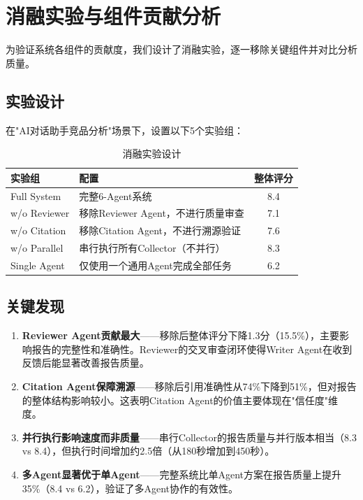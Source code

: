 \documentclass[12pt,a4paper]{ctexrep}
\begin{document}
\chapter{消融实验与组件贡献分析}

为验证系统各组件的贡献度，我们设计了消融实验，逐一移除关键组件并对比分析质量。

\section{实验设计}

在"AI对话助手竞品分析"场景下，设置以下5个实验组：

\begin{table}[H]
\centering
\caption{消融实验设计}
\begin{tabularx}{\textwidth}{lXc}
\toprule
\textbf{实验组} & \textbf{配置} & \textbf{整体评分} \\
\midrule
Full System & 完整6-Agent系统 & 8.4 \\
w/o Reviewer & 移除Reviewer Agent，不进行质量审查 & 7.1 \\
w/o Citation & 移除Citation Agent，不进行溯源验证 & 7.6 \\
w/o Parallel & 串行执行所有Collector（不并行） & 8.3 \\
Single Agent & 仅使用一个通用Agent完成全部任务 & 6.2 \\
\bottomrule
\end{tabularx}
\end{table}

\section{关键发现}

\begin{enumerate}
\item \textbf{Reviewer Agent贡献最大}——移除后整体评分下降1.3分（15.5\%），主要影响报告的完整性和准确性。Reviewer的交叉审查闭环使得Writer Agent在收到反馈后能显著改善报告质量。

\item \textbf{Citation Agent保障溯源}——移除后引用准确性从74\%下降到51\%，但对报告的整体结构影响较小。这表明Citation Agent的价值主要体现在"信任度"维度。

\item \textbf{并行执行影响速度而非质量}——串行Collector的报告质量与并行版本相当（8.3 vs 8.4），但执行时间增加约2.5倍（从180秒增加到450秒）。

\item \textbf{多Agent显著优于单Agent}——完整系统比单Agent方案在报告质量上提升35\%（8.4 vs 6.2），验证了多Agent协作的有效性。
\end{enumerate}
\end{document}
